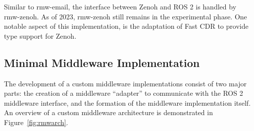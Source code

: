         Similar to \textsf{rmw-email}, the interface between Zenoh and \ac{ROS} 2 is handled by \textsf{rmw-zenoh}. As of 2023, \textsf{rmw-zenoh} still remains in the experimental phase. One notable aspect of this implementation, is the adaptation of Fast CDR to provide type support for Zenoh.

    \subsection{Minimal Middleware Implementation}\label{ssec:minimal}

        The development of a custom middleware implementations consist of two major parts: the creation of a middleware ``adapter'' to communicate with the \ac{ROS} 2 middleware interface, and the formation of the middleware implementation itself. An overview of a custom middleware architecture is demonstrated in Figure~\ref{fig:rmwarch}. 

